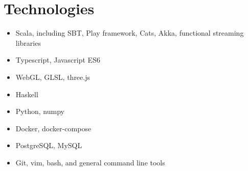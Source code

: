 \documentclass[10pt]{article}
\begin{document}
\section*{Technologies}
\begin{multicols}{2}
\begin{itemize}
    \itemsep0em
    \item Scala, including SBT, Play framework, Cats, Akka, functional streaming libraries
    \item Typescript, Javascript ES6
    \item WebGL, GLSL, three.js
    \item Haskell
    \item Python, numpy
    \item Docker, docker-compose
    \item PostgreSQL, MySQL
    \item Git, vim, bash, and general command line tools
\end{itemize}
\end{multicols}
\end{document}

